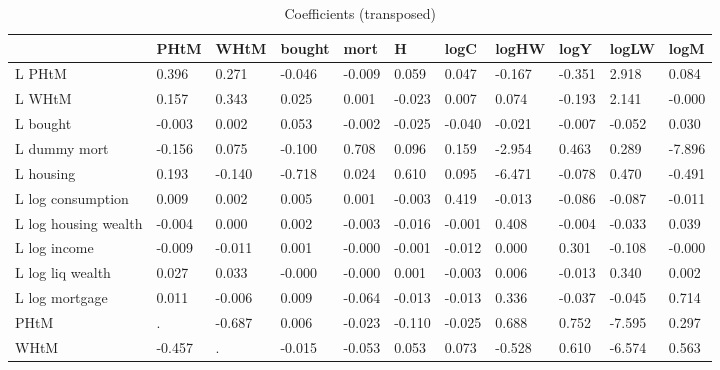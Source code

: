 \begin{table}[htbp]
\caption{\label{clabel} Coefficients (transposed)}\centering\medskip
\begin{tabular}{lllllllllll} \hline \hline
 & PHtM  & WHtM  & bought  & mort  & H  & logC  & logHW  & logY  & logLW  & logM  \\  \hline 
L PHtM &     0.396 &     0.271 &    -0.046 &    -0.009 &     0.059 &     0.047 &    -0.167 &    -0.351 &     2.918 &     0.084 \\  
L WHtM &     0.157 &     0.343 &     0.025 &     0.001 &    -0.023 &     0.007 &     0.074 &    -0.193 &     2.141 &    -0.000 \\  
L bought &    -0.003 &     0.002 &     0.053 &    -0.002 &    -0.025 &    -0.040 &    -0.021 &    -0.007 &    -0.052 &     0.030 \\  
L dummy mort &    -0.156 &     0.075 &    -0.100 &     0.708 &     0.096 &     0.159 &    -2.954 &     0.463 &     0.289 &    -7.896 \\  
L housing &     0.193 &    -0.140 &    -0.718 &     0.024 &     0.610 &     0.095 &    -6.471 &    -0.078 &     0.470 &    -0.491 \\  
L log consumption &     0.009 &     0.002 &     0.005 &     0.001 &    -0.003 &     0.419 &    -0.013 &    -0.086 &    -0.087 &    -0.011 \\  
L log housing wealth &    -0.004 &     0.000 &     0.002 &    -0.003 &    -0.016 &    -0.001 &     0.408 &    -0.004 &    -0.033 &     0.039 \\  
L log income &    -0.009 &    -0.011 &     0.001 &    -0.000 &    -0.001 &    -0.012 &     0.000 &     0.301 &    -0.108 &    -0.000 \\  
L log liq wealth &     0.027 &     0.033 &    -0.000 &    -0.000 &     0.001 &    -0.003 &     0.006 &    -0.013 &     0.340 &     0.002 \\  
L log mortgage &     0.011 &    -0.006 &     0.009 &    -0.064 &    -0.013 &    -0.013 &     0.336 &    -0.037 &    -0.045 &     0.714 \\  
PHtM &         . &    -0.687 &     0.006 &    -0.023 &    -0.110 &    -0.025 &     0.688 &     0.752 &    -7.595 &     0.297 \\  
WHtM &    -0.457 &         . &    -0.015 &    -0.053 &     0.053 &     0.073 &    -0.528 &     0.610 &    -6.574 &     0.563 \\  

\end{tabular}
\end{table}
